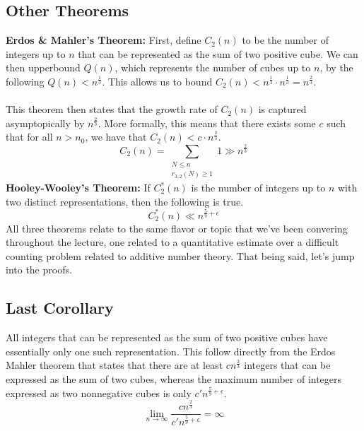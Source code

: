 \documentclass[8pt]{extarticle}
\begin{document}
\subsection{Other Theorems}
\textbf{Erdos \& Mahler's Theorem:} First, define $C_2(n)$ to be the number of integers up to $n$ that can be represented as the sum of two positive cube. We can then upperbound $Q(n)$, which represents the number of cubes up to $n$, by the following $Q(n) < n^{\frac{1}{3}}$. This allows us to bound $C_2(n) < n^{\frac{1}{3}} \cdot n^{\frac{1}{3}} = n^{\frac{2}{3}}$. \\
\\
This theorem then states that the growth rate of $C_2(n)$ is captured asymptopically by $n^{\frac{2}{3}}$. More formally, this means that there exists some $c$ such that for all $n > n_0$, we have that $C_2(n) < c \cdot n^{\frac{2}{3}}$.
$$
C_2(n) = \sum_{\substack{N \leq n \\ r_{3,2}(N) \geq 1}} 1 \gg n^{\frac{2}{3}}
$$
\textbf{Hooley-Wooley's Theorem:} If $C^*_2(n)$ is the number of integers up to $n$ with two distinct representations, then the following is true.
$$
C^*_2(n) \ll n^{\frac{5}{9} + \epsilon}
$$
All three theorems relate to the same flavor or topic that we've been convering throughout the lecture, one related to a quantitative estimate over a difficult counting problem related to additive number theory. That being said, let's jump into the proofs.
\subsection{Last Corollary}
All integers that can be represented as the sum of two positive cubes have essentially only one such representation. This follow directly from the Erdos Mahler theorem that states that there are at least $cn^{\frac{2}{3}}$ integers that can be expressed as the sum of two cubes, whereas the maximum number of integers expressed as two nonnegative cubes is only $c'n^{\frac{5}{9} + \epsilon}$.
$$
\lim_{n\rightarrow\infty} \frac{cn^{\frac{2}{3}}}{c'n^{\frac{5}{9} + \epsilon}} = \infty
$$
\end{document}
